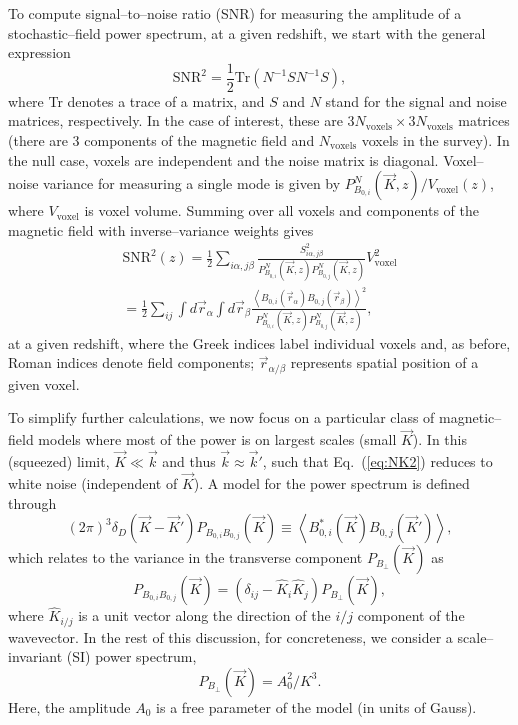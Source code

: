 \documentclass[aps,prd,twocolumn,floatfix,showpacs,superscriptaddress,nofootinbib]{revtex4-1}
\newcommand{\beq}{\begin{equation}}
\newcommand{\eeq}{\end{equation}}
\newcommand{\bga}{\begin{gathered}}
\newcommand{\ega}{\end{gathered}}
\newcommand{\eq}[1]{{Eq.~(#1)}}
\begin{document}
To compute signal--to--noise ratio (SNR) for measuring the amplitude of a stochastic--field power spectrum, at a given redshift, we start with the general expression  
\beq
\text{SNR}^2 = \frac{1}{2} \text{Tr} \left( N^{-1}SN^{-1}S\right),
\label{eq:snr_general}
\eeq
where Tr denotes a trace of a matrix, and $S$ and $N$ stand for the signal and noise matrices, respectively. In the case of interest, these are $3N_\text{voxels}\times 3N_\text{voxels}$ matrices (there are 3 components of the magnetic field and $N_\text{voxels}$ voxels in the survey). In the null case, voxels are independent and the noise matrix is diagonal. Voxel--noise  variance for measuring a single mode is given by $P^N_{B_{0,i}}(\vec K, z)/V_\text{voxel} (z)$, where $V_\text{voxel}$ is voxel volume. Summing over all voxels and components of the magnetic field with inverse--variance weights gives
\beq
\bga
\text{SNR}^2 (z)= \frac{1}{2} \sum_{i\alpha, j\beta} \frac{S_{i\alpha , j\beta}^2}{P^N_{B_{0,i}}(\vec K, z)P^N_{B_{0,j}}(\vec K, z)} V_\text{voxel}^2\\=
\frac{1}{2} \sum_{ij} \int d\vec r_\alpha \int d\vec r_\beta \frac{\left< B_{0,i}(\vec r_\alpha) B_{0,j}(\vec r_\beta)\right>^2}{P^N_{B_{0,i}}(\vec K, z)P^N_{B_{0,j}}(\vec K, z)},
\ega
\label{eq:snr_z_step1}
\eeq
at a given redshift, where the Greek indices label individual voxels and, as before, Roman indices denote field components; $\vec r_{\alpha/\beta}$ represents spatial position of a given voxel. 

To simplify further calculations, we now focus on a particular class of magnetic--field models where most of the power is on largest scales (small $\vec K$). In this (squeezed) limit, $\vec K \ll \vec k$ and thus $\vec k \approx \vec k'$, such that \eq{\ref{eq:NK2}} reduces to white noise (independent of $\vec K$). A model for the power spectrum is defined through
\beq
(2\pi)^3\delta_D(\vec K - \vec K') P_{B_{0,i}B_{0,j}}(\vec K) \equiv \left<B_{0,i}^*(\vec K) B_{0,j}(\vec K')\right>,
\label{eq:Pbb}
\eeq
which relates to the variance in the transverse component $P_{B_\bot}(\vec K)$ as
\beq
P_{B_{0,i}B_{0,j}}(\vec K) = (\delta_{ij} - \widehat K_i \widehat K_j) P_{B_\bot}(\vec K),
\label{eq:Pbb_Pb}
\eeq
where $\widehat K_{i/j}$ is a unit vector along the direction of the ${i/j}$ component of the wavevector.
In the rest of this discussion, for concreteness, we consider a scale--invariant (SI) power spectrum, 
\beq
P_{{B_\bot}}(\vec K) = A_0^2/K^3.
\label{eq:SI}
\eeq
Here, the amplitude $A_0$ is a free parameter of the model (in units of Gauss).
\end{document}
